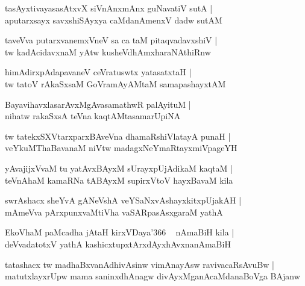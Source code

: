\documentclass[twoside,12pt,openright]{book}
\newcounter{shloka}[chapter]
\begin{document}
\begin{shloka}%
tasAyxtivayasasAtxvX siVnAnxmAnx guNavatiV sutA |\\
aputarxsayx savxshiSAyxya caMdanAmenxV dadw sutAM 
\end{shloka}

\begin{shloka}%
taveVva putarxvanemxVneV sa ca taM pitaqvadavxshiV |\\
tw kadAcidavxnaM yAtw kusheVdhAmxharaNAthiRnw 
\end{shloka}

\begin{shloka}%
himAdirxpAdapavaneV ceVratuswtx yatasatxtaH |\\
tw tatoV rAkaSxsaM GoVramAyAMtaM samapashayxtAM 
\end{shloka}

\begin{shloka}%
BayavihavxlasarAvxMgAvasamathwR palAyituM |\\
nihatw rakaSxsA teVna kaqtAMtasamarUpiNA 
\end{shloka}

\begin{shloka}%
tw tatekxSXVtarxparxBAveVna dhamaRshiVlatayA punaH |\\
veYkuMThaBavanaM niVtw madagxNeYmaRtayxmiVpageYH
\end{shloka}

\begin{shloka}%
yAvajijxVvaM tu yatAvxBAyxM sUrayxpUjAdikaM kaqtaM |\\
teVnAhaM kamaRNa tABAyxM supirxVtoV hayxBavaM kila
\end{shloka}

\begin{shloka}%
swrAshacx sheYvA gANeVshA veYSaNxvAshayxkitxpUjakAH |\\
mAmeVva pArxpunxvaMtiVha vaSARpasAsxgaraM yathA 
\end{shloka}

\begin{shloka}%
EkoVhaM paMcadha jAtaH kirxVDaya\char'366 ~ nAmaBiH kila |\\
deVvadatotxV yathA kashicxtupxtArxdAyxhAvxnanAmaBiH
\end{shloka}

\begin{shloka}%
tatashacx tw madhaBxvanAdhivAsinw vimAnayAsw ravivacaRsAvuBw |\\
matutxlayxrUpw mama saninxdhAnagw divAyxMganAcaMdanaBoVga BAjanw
\end{shloka}
\end{document}
